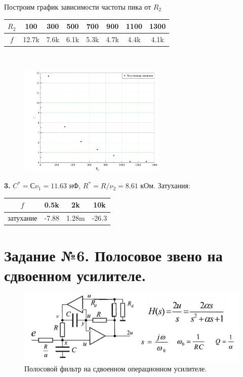 \documentclass[a4paper, 12pt, twoside]{article}
\begin{document}
\noindent Построим график зависимости частоты пика от $ R_2 $

\begin{minipage}{0.55\linewidth}
	\begin{table}[H]
		\begin{tabular}{c | c c c c c c c}
			$ R_2 $ & 100 & 300 & 500 & 700 & 900 & 1100 & 1300 \\ \midrule
			$ f $ & 12.7k & 7.6k & 6.1k & 5.3k & 4.7k & 4.4k & 4.1k 
		\end{tabular}
	\end{table}
\end{minipage}
~
\begin{minipage}{0.45\linewidth}
	\begin{figure}[H]
		\includegraphics[width=70mm]{2}
	\end{figure}
\end{minipage}

\textbf{3.} $ C^* = С\nu_1 = 11.63 $ нФ, $ R^*=R/\nu_2 = 8.61 $ кОм. Затухания:
\begin{table}[H]
	\begin{tabular}{c | c c c}
		$ f $ & 0.5k & 2k & 10k \\ \midrule
		затухание & -7.88  & 1.28m & -26.3
	\end{tabular}
\end{table}

\newpage 

\section*{Задание №6. Полосовое звено на сдвоенном усилителе.}

\begin{figure}[H]
	\centering
	\includegraphics[width =  0.9\linewidth]{pfiltropus}
	\caption{Полосовой фильтр на сдвоенном операционном усилителе.}
	
\end{figure}
\end{document}
